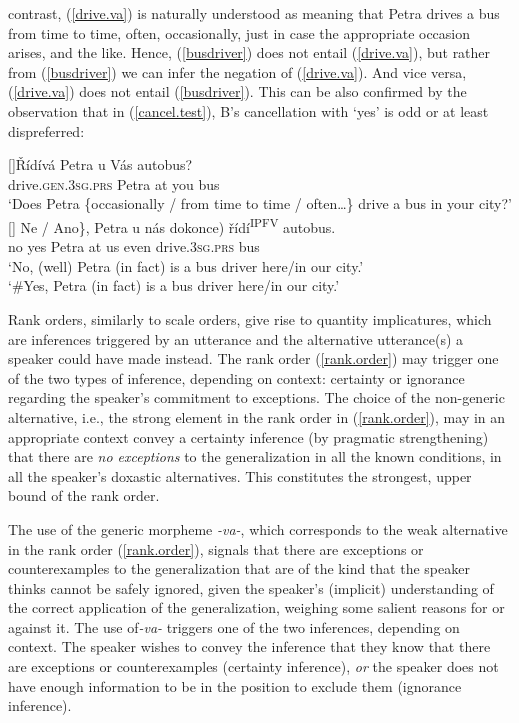 \documentclass[output=paper,colorlinks,citecolor=brown]{langscibook}
\begin{document}
contrast, (\ref{drive.va}) is naturally understood as meaning that
Petra drives a bus from time to time, often, occasionally,
just in case the appropriate occasion arises, and the like.
Hence,
(\ref{busdriver}) does not entail (\ref{drive.va}),
but rather from (\ref{busdriver}) we can infer the negation of (\ref{drive.va}).
And vice versa, (\ref{drive.va}) does not entail (\ref{busdriver}).
This can be also confirmed
by the observation that in (\ref{cancel.test}), B's cancellation with `yes' is odd or at least dispreferred:
\ea\label{cancel.test}
\begin{xlist}
[]{\gll Řídívá Petra u Vás autobus?    \\
drive.\textsc{gen.3sg.prs} Petra at you bus \\
\glt `Does Petra \{occasionally / from time to time / often\dots\} drive a bus in your city?'}
[]{\gll \minsp{\{} Ne / \minsp{\#} Ano\}, Petra u nás \minsp{(} dokonce) řídí\textsuperscript{IPFV} autobus.\\
{} no {} {} yes  Petra at us {} even drive.\textsc{3sg.prs} bus	\\
\glt `No, (well) Petra (in fact) is a bus driver here/in our city.' \label{cancel.va.test}\\
{`\#Yes, Petra (in fact) is a bus driver here/in our city.'}}
\end{xlist}
\z


\noindent Rank orders, similarly to scale orders, give
rise to quantity implicatures,
which are inferences triggered by an utterance and the alternative utterance(s) a speaker could have made instead. The rank order (\ref{rank.order}) may trigger
one of the two types of inference, depending on context: certainty or ignorance regarding the
speaker's commitment to exceptions.
The choice of the non-generic alternative, i.e., the strong element in the rank order in (\ref{rank.order}),
may in an appropriate context convey a certainty inference (by pragmatic strengthening) that there are \textit{no exceptions} to the generalization
in all the known conditions, in all the speaker's doxastic alternatives. This constitutes the strongest, upper bound of the rank order.

The use of the generic morpheme \textit{-va-}, which corresponds
to the weak alternative in the rank order (\ref{rank.order}), signals that there are exceptions or counterexamples
to the generalization that are of the kind that
the speaker thinks cannot be safely ignored,
given the speaker's (implicit) understanding
of the correct application of the generalization,
weighing some salient reasons for or against it.
The use of\linebreak \textit{-va-} triggers one of the two inferences, depending on context.
The speaker wishes to convey the inference that they know
that there are exceptions or counterexamples (certainty inference), \textit{or} the speaker
does not have enough information
to be in the position to exclude them (ignorance inference).
\end{document}
